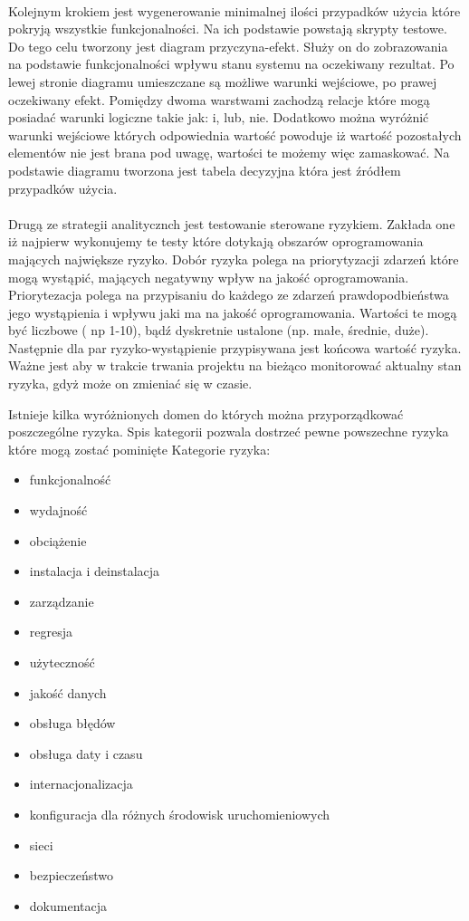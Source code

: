 \paragraph{}
Kolejnym krokiem jest wygenerowanie minimalnej ilości przypadków użycia które pokryją wszystkie funkcjonalności. Na ich podstawie powstają skrypty testowe. Do tego celu tworzony jest diagram przyczyna-efekt. Służy on do zobrazowania na podstawie funkcjonalności wpływu stanu systemu na oczekiwany rezultat. Po lewej stronie diagramu umieszczane są możliwe warunki wejściowe, po prawej oczekiwany efekt. Pomiędzy dwoma warstwami zachodzą relacje które mogą posiadać warunki logiczne takie jak: i, lub, nie. Dodatkowo można wyróżnić warunki wejściowe których odpowiednia wartość powoduje iż wartość pozostałych elementów nie jest brana pod uwagę, wartości te możemy więc zamaskować. Na podstawie diagramu tworzona jest tabela decyzyjna która jest źródłem przypadków użycia.
\paragraph{}
Drugą ze strategii analitycznch jest testowanie sterowane ryzykiem. Zakłada one iż najpierw wykonujemy te testy które dotykają obszarów oprogramowania mających największe ryzyko.  Dobór ryzyka polega na priorytyzacji zdarzeń które mogą wystąpić, mających negatywny wpływ na jakość oprogramowania.
Priorytezacja polega na przypisaniu do każdego ze zdarzeń prawdopodbieństwa jego wystąpienia i wpływu jaki ma na jakość oprogramowania. Wartości te mogą być liczbowe ( np 1-10), bądź dyskretnie ustalone (np. małe, średnie, duże). Następnie dla par ryzyko-wystąpienie przypisywana jest końcowa wartość ryzyka. Ważne jest aby w trakcie trwania projektu na bieżąco monitorować aktualny stan ryzyka, gdyż może on zmieniać się w czasie.

Istnieje kilka wyróżnionych domen do których można przyporządkować poszczególne ryzyka. Spis kategorii pozwala dostrzeć pewne powszechne ryzyka które mogą zostać pominięte
Kategorie ryzyka:
\begin{itemize}
  \item funkcjonalność
  \item wydajność
  \item obciążenie
  \item instalacja i deinstalacja
  \item zarządzanie
  \item regresja
  \item użyteczność
  \item jakość danych
  \item obsługa błędów
  \item obsługa daty i czasu
  \item internacjonalizacja
  \item konfiguracja dla różnych środowisk uruchomieniowych
  \item sieci
  \item bezpieczeństwo
  \item dokumentacja
\end{itemize}

